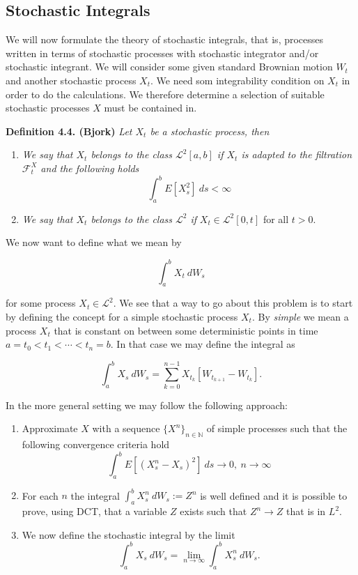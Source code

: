 \documentclass[a4paper,10pt,openany]{book}
\providecommand{\tightlist}{%
 \setlength{\itemsep}{0pt}\setlength{\parskip}{0pt}}
\begin{document}
\hypertarget{stochastic-integrals-1}{%
\subsection{Stochastic Integrals}\label{stochastic-integrals-1}}

We will now formulate the theory of stochastic integrals, that is, processes written in terms of stochastic processes with stochastic integrator and/or stochastic integrant. We will consider some given standard Brownian motion \(W_t\) and another stochastic process \(X_t\). We need som integrability condition on \(X_t\) in order to do the calculations. We therefore determine a selection of suitable stochastic processes \(X\) must be contained in.

\textbf{Definition 4.4. (Bjork)} \emph{Let \(X_t\) be a stochastic process, then}

\begin{enumerate}
\def\labelenumi{\roman{enumi}.}
\tightlist
\item
  \emph{We say that \(X_t\) belongs to the class \(\mathcal{L}^2[a,b]\) if \(X_t\) is adapted to the filtration \(\mathcal{F}^X_t\) and the following holds}
  \[\int_a^bE[X_s^2]\ ds<\infty\]
\item
  \emph{We say that \(X_t\) belongs to the class \(\mathcal{L}^2\) if} \(X_t\in\mathcal{L}^2[0,t]\) for all \(t>0\).
\end{enumerate}

We now want to define what we mean by

\[
\int_a^bX_t\ dW_s
\]

for some process \(X_t\in\mathcal{L}^2\). We see that a way to go about this problem is to start by defining the concept for a simple stochastic process \(X_t\). By \emph{simple} we mean a process \(X_t\) that is constant on between some deterministic points in time \(a=t_0<t_1<\cdots<t_n=b\). In that case we may define the integral as

\[
\int_a^bX_s\ dW_s = \sum_{k=0}^{n-1}X_{t_k}[W_{t_{k+1}}-W_{t_k}].\tag{4.8}
\]

In the more general setting we may follow the following approach:

\begin{enumerate}
\def\labelenumi{\arabic{enumi}.}
\tightlist
\item
  Approximate \(X\) with a sequence \(\{X^n\}_{n\in\mathbb{N}}\) of simple processes such that the following convergence criteria hold
  \[
    \int_a^bE[(X_s^n-X_s)^2]\ ds\to 0,\ n\to\infty
    \]
\item
  For each \(n\) the integral \(\int_a^b X_s^n\ dW_s:=Z^n\) is well defined and it is possible to prove, using DCT, that a variable \(Z\) exists such that \(Z^n\to Z\) that is in \(L^2\).
\item
  We now define the stochastic integral by the limit
  \[
    \int_a^b X_s\ dW_s=\lim_{n\to \infty}\int_a^b X_s^n\ dW_s.\tag{4.9}
    \]
\end{enumerate}
\end{document}

